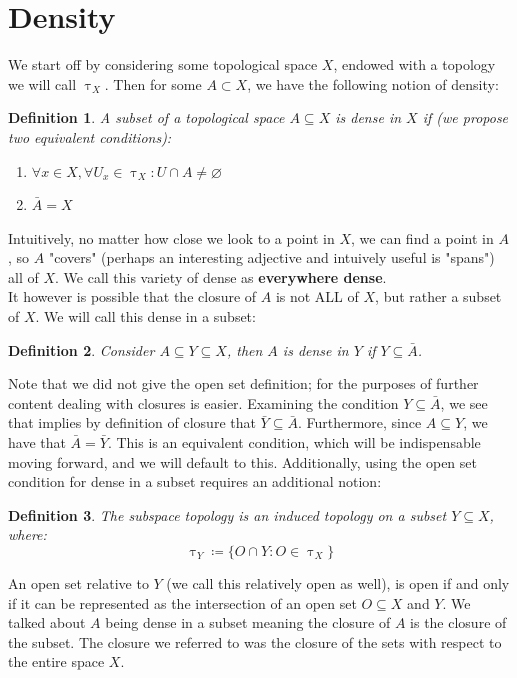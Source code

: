 \documentclass{exam}
\author{Omkar Tasgaonkar}
\newtheorem{defn}{Definition}[section]
\begin{document}
\thispagestyle{firstpage}

\section*{Density}
We start off by considering some topological space $X$, endowed with a topology we will call $\uptau_X$. Then for some $A \subset X$, we have the following notion of density:
\begin{defn}
A subset of a topological space $A \subseteq X$ is dense in $X$ if (we propose two equivalent conditions):
\begin{enumerate}
  \item $\forall x \in X, \forall U_x \in \uptau_X: U \cap A \neq \varnothing$
  \item $\bar{A} = X$
\end{enumerate}
\end{defn}
Intuitively, no matter how close we look to a point in $X$, we can find a point in $A$, so $A$ "covers" (perhaps an interesting adjective and intuively useful is "spans") all of $X$. We call this variety of dense as \textbf{everywhere dense}.\\

It however is possible that the closure of $A$ is not ALL of $X$, but rather a subset of $X$. We will call this dense in a subset:
\begin{defn}
Consider $A \subseteq Y \subseteq X$, then $A$ is dense in $Y$ if $Y \subseteq \bar{A}$.
\end{defn}
Note that we did not give the open set definition; for the purposes of further content dealing with closures is easier. Examining the condition $Y \subseteq \bar{A}$, we see that implies by definition of closure that $\bar{Y} \subseteq \bar{A}$. Furthermore, since $A \subseteq Y$, we have that $\bar{A} = \bar{Y}$. This is an equivalent condition, which will be indispensable moving forward, and we will default to this. Additionally, using the open set condition for dense in a subset requires an additional notion:
\begin{defn}
The subspace topology is an induced topology on a subset $Y \subseteq X$, where:
\begin{equation*}
  \uptau_Y \coloneq \{O \cap Y : O \in \uptau_X\}
\end{equation*}
\end{defn}
An open set relative to $Y$ (we call this relatively open as well), is open if and only if it can be represented as the intersection of an open set $O \subseteq X$ and $Y$. We talked about $A$ being dense in a subset meaning the closure of $A$ is the closure of the subset. The closure we referred to was the closure of the sets with respect to the entire space $X$.\\
\end{document}
